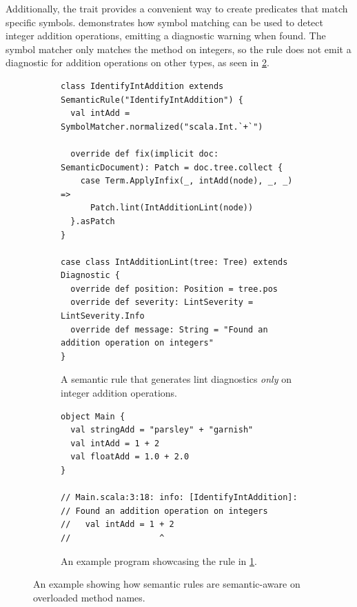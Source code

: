 \documentclass[../../main.tex]{subfiles}
\begin{document}
Additionally, the  trait provides a convenient way to create predicates that match specific symbols.
 demonstrates how symbol matching can be used to detect integer addition operations, emitting a diagnostic warning when found.
The  symbol matcher only matches the \scala{+} method on integers, so the rule does not emit a diagnostic for addition operations on other types, as seen in \cref{fig:semantic-rule-ex-example}.


\begin{figure}[htbp]
\begin{subfigure}{\textwidth}
\begin{verbatim}
class IdentifyIntAddition extends SemanticRule("IdentifyIntAddition") {
  val intAdd = SymbolMatcher.normalized("scala.Int.`+`")

  override def fix(implicit doc: SemanticDocument): Patch = doc.tree.collect {
    case Term.ApplyInfix(_, intAdd(node), _, _) =>
      Patch.lint(IntAdditionLint(node))
  }.asPatch
}

case class IntAdditionLint(tree: Tree) extends Diagnostic {
  override def position: Position = tree.pos
  override def severity: LintSeverity = LintSeverity.Info
  override def message: String = "Found an addition operation on integers"
}
\end{verbatim}
\caption{A semantic rule that generates lint diagnostics \emph{only} on integer addition operations.}
\label{fig:semantic-rule-ex-impl}
\end{subfigure}
%
\begin{subfigure}{\textwidth}
\vspace{3ex} %
\begin{verbatim}
object Main {
  val stringAdd = "parsley" + "garnish"
  val intAdd = 1 + 2
  val floatAdd = 1.0 + 2.0
}

// Main.scala:3:18: info: [IdentifyIntAddition]:
// Found an addition operation on integers
//   val intAdd = 1 + 2
//                  ^
\end{verbatim}
\caption{An example program showcasing the rule in \cref{fig:semantic-rule-ex-impl}.}
\label{fig:semantic-rule-ex-example}
\end{subfigure}
\caption{An example showing how semantic rules are semantic-aware on overloaded method names.}
\label{fig:semantic-rule-ex}
\end{figure}

\end{document}
